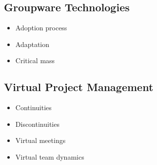 \subsection{Groupware Technologies}
\begin{itemize}
  \item Adoption process
  \item Adaptation
  \item Critical mass
\end{itemize}

\subsection{Virtual Project Management}
\begin{itemize}
  \item Continuities
  \item Discontinuities
  \item Virtual meetings
	\item Virtual team dynamics
\end{itemize}